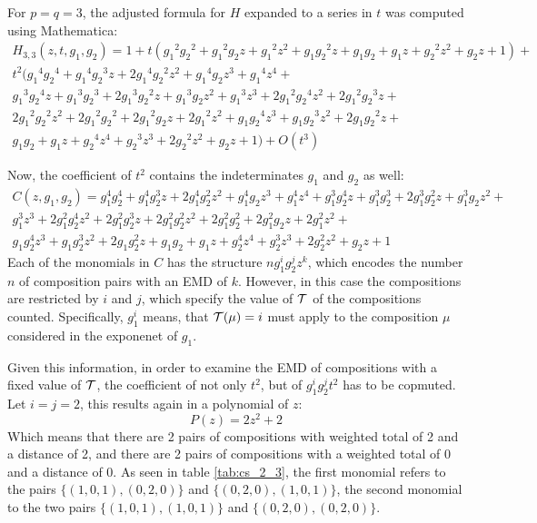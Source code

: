 \documentclass[12pt,letterpaper,oneside,openany]{book}
\begin{document}
For $p=q=3$, the adjusted formula for $H$ expanded to a series in $t$ was computed using Mathematica:
\begin{multline*}
	H_{3, 3}(z, t, g_1, g_2)=1+t ({g_1}^2 {g_2}^2+{g_1}^2 {g_2} z+{g_1}^2 z^2+{g_1} {g_2}^2 z+{g_1} {g_2}+{g_1} z+{g_2}^2 z^2+{g_2} z+1)+\\t^2 ({g_1}^4 {g_2}^4+{g_1}^4 {g_2}^3 z+2 {g_1}^4 {g_2}^2 z^2+{g_1}^4 {g_2} z^3+{g_1}^4 z^4+\\{g_1}^3 {g_2}^4 z+{g_1}^3 {g_2}^3+2 {g_1}^3 {g_2}^2 z+{g_1}^3 {g_2} z^2+{g_1}^3 z^3+2 {g_1}^2 {g_2}^4 z^2+2 {g_1}^2 {g_2}^3 z+\\2 {g_1}^2 {g_2}^2 z^2+2 {g_1}^2 {g_2}^2+2 {g_1}^2 {g_2} z+2 {g_1}^2 z^2+{g_1} {g_2}^4 z^3+{g_1} {g_2}^3 z^2+2 {g_1} {g_2}^2 z+\\{g_1} {g_2}+{g_1} z+{g_2}^4 z^4+{g_2}^3 z^3+2 {g_2}^2 z^2+{g_2} z+1)+O(t^3)
\end{multline*}


Now, the coefficient of $t^2$ contains the indeterminates $g_1$ and $g_2$ as well:
\begin{multline*}
	C(z, g_1, g_2)=g_1^4 g_2^4+g_1^4 g_2^3 z+2 g_1^4 g_2^2 z^2+g_1^4 g_2 z^3+g_1^4 z^4+g_1^3 g_2^4 z+g_1^3 g_2^3+2 g_1^3 g_2^2 z+g_1^3 g_2 z^2+ \\
	g_1^3 z^3+2 g_1^2 g_2^4 z^2+2 g_1^2 g_2^3 z+2 g_1^2 g_2^2 z^2+2 g_1^2 g_2^2+2 g_1^2 g_2 z+2 g_1^2 z^2+\\
	g_1 g_2^4 z^3+g_1 g_2^3 z^2+2 g_1 g_2^2 z+g_1 g_2+g_1 z+g_2^4 z^4+g_2^3 z^3+2 g_2^2 z^2+g_2 z+1
\end{multline*}
Each of the monomials in $C$ has the structure $ng_1^ig_2^jz^k$, which encodes the number $n$ of composition pairs with an EMD of $k$. However, in this case the compositions are restricted by $i$ and $j$, which specify the value of ${\mathcal{T}}$ of the compositions counted. 
Specifically, $g_1^i$ means, that ${\mathcal{T}}(\mu)=i$ must apply to the composition $\mu$ considered in the exponenet of $g_1$.

Given this information, in order to examine the EMD of compositions with a fixed value of ${\mathcal{T}}$, the coefficient of not only $t^2$, but of $g_1^ig_2^jt^2$ has to be copmuted. Let $i=j=2$, this results again in a polynomial of $z$:
$$P(z)=2 z^2+2$$
Which means that there are 2 pairs of compositions with weighted total of  2 and a distance of 2, and there are 2 pairs of compositions with a weighted total of 0 and a distance of 0. As seen in table \ref{tab:cs_2_3}, the first monomial refers to the pairs $\{(1, 0, 1), (0, 2, 0)\}$ and $ \{(0, 2, 0), (1, 0, 1)\}$, the second monomial to the two pairs $\{(1, 0, 1), (1, 0, 1)\}$ and $\{(0, 2, 0), (0, 2, 0)\}$.
\end{document}
